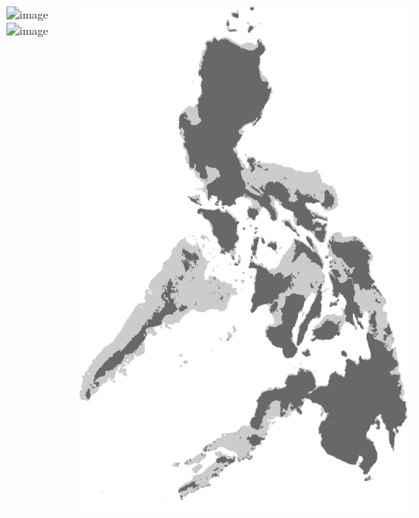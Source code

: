 \begin{frame}
\begin{columns}[c]
\begin{center}
            \vspace{0.7mm}
            \includegraphics<1>[height=1.4cm]{../images/photos/hipposideros-obscurus-MRMDuya.jpg}
            \hspace{0.3mm}
            \includegraphics<1>[height=1.4cm]{../images/photos/crocidura-negrina-JAEsselstyn.jpg}
        \end{center}
        \includegraphics[width=\textwidth]{../images/maps/Philippines.png}
    \end{columns}
\end{frame}

